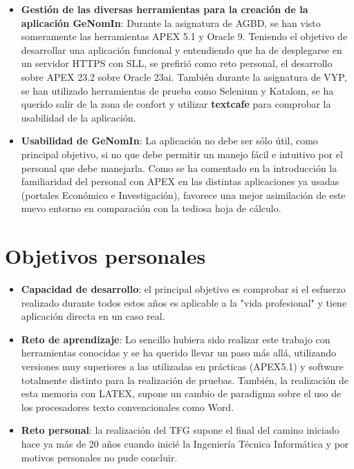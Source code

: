 \begin{itemize}
	\item \textbf{Gestión de las diversas herramientas para la creación de la aplicación GeNomIn}: 
	Durante la asignatura de \acrfull{AGBD}, se han visto someramente las herramientas \acrshort{APEX} 5.1 y Oracle 9. Teniendo el objetivo de desarrollar una aplicación funcional y entendiendo que ha de desplegarse en un servidor \acrshort{HTTPS} con \gls{SLL}, se prefirió como reto personal, el desarrollo sobre \acrfull{APEX} 23.2 sobre Oracle 23ai. También durante la asignatura de \acrfull{VYP}, se han utilizado herramientas de prueba como Selenium y Katalom, se ha querido salir de la zona de confort y utilizar \textbf{textcafe} para comprobar la usabilidad de la aplicación.
	\item \textbf{Usabilidad de \textbf{GeNomIn}}: La aplicación no debe ser sólo útil, como principal objetivo, si no que debe permitir un manejo fácil e intuitivo por el personal que debe manejarla. Como se ha comentado en la introducción la familiaridad del personal con \acrfull{APEX} en las distintas aplicaciones ya usadas (portales Económico e Investigación), favorece una mejor asimilación de este nuevo entorno en comparación con la tediosa hoja de cálculo. 
\end{itemize}

\section{Objetivos personales}

\begin{itemize}
	\item \textbf{Capacidad de desarrollo}: el principal objetivo es comprobar si el esfuerzo realizado durante todos estos años es aplicable a la "vida profesional" y tiene aplicación directa en un caso real. 
	\item \textbf{Reto de aprendizaje}: Lo sencillo hubiera sido realizar este trabajo con herramientas conocidas y se ha querido llevar un paso más allá, utilizando versiones muy superiores a las utilizadas en prácticas (\acrshort{APEX}5.1) y software totalmente distinto para la realización de pruebas.
	También, la realización de esta memoria con \gls{LATEX}, supone un cambio de paradigma sobre el uso de los procesadores texto convencionales como Word.
	\item \textbf{Reto personal}: la realización del \acrshort{TFG} supone el final del camino iniciado hace ya más de 20 años cuando inicié la Ingeniería Técnica Informática y por motivos personales no pude concluir.
\end{itemize}
